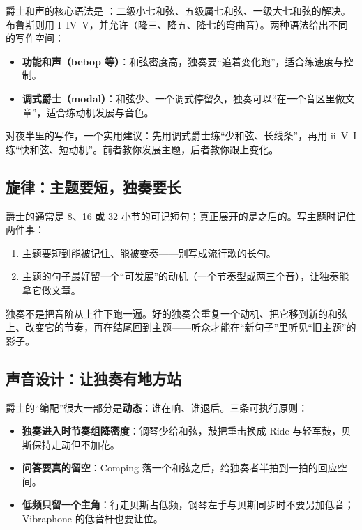 爵士和声的核心语法是 ：二级小七和弦、五级属七和弦、一级大七和弦的解决。布鲁斯则用 I–IV–V，并允许（降三、降五、降七的弯曲音）。两种语法给出不同的写作空间：

\begin{itemize}
\item \textbf{功能和声（bebop 等）}：和弦密度高，独奏要“追着变化跑”，适合练速度与控制。
\item \textbf{调式爵士（modal）}：和弦少、一个调式停留久，独奏可以“在一个音区里做文章”，适合练动机发展与音色。
\end{itemize}

对夜半里的写作，一个实用建议：先用调式爵士练“少和弦、长线条”，再用 ii–V–I 练“快和弦、短动机”。前者教你发展主题，后者教你跟上变化。

\subsection{旋律：主题要短，独奏要长}
\label{sec:jazz-melody}

爵士的通常是 8、16 或 32 小节的可记短句；真正展开的是之后的。写主题时记住两件事：

\begin{enumerate}
\item 主题要短到能被记住、能被变奏——别写成流行歌的长句。
\item 主题的句子最好留一个“可发展”的动机（一个节奏型或两三个音），让独奏能拿它做文章。
\end{enumerate}

独奏不是把音阶从上往下跑一遍。好的独奏会重复一个动机、把它移到新的和弦上、改变它的节奏，再在结尾回到主题——听众才能在“新句子”里听见“旧主题”的影子。

\subsection{声音设计：让独奏有地方站}
\label{sec:jazz-sound}

爵士的“编配”很大一部分是\textbf{动态}：谁在响、谁退后。三条可执行原则：

\begin{itemize}
\item \textbf{独奏进入时节奏组降密度}：钢琴少给和弦，鼓把重击换成 Ride 与轻军鼓，贝斯保持走动但不加花。
\item \textbf{问答要真的留空}：Comping 落一个和弦之后，给独奏者半拍到一拍的回应空间。
\item \textbf{低频只留一个主角}：行走贝斯占低频，钢琴左手与贝斯同步时不要另加低音；Vibraphone 的低音杆也要让位。
\end{itemize}

